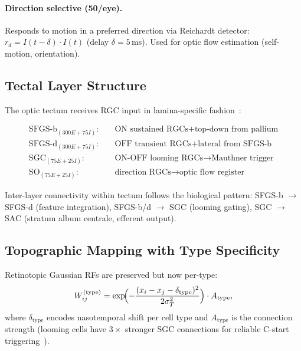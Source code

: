 \documentclass[11pt,a4paper]{article}
\begin{document}
\paragraph{Direction selective (50/eye).}
Responds to motion in a preferred direction via Reichardt detector:
$r_d = I(t-\delta) \cdot I(t)$ (delay $\delta = 5$\,ms).
Used for optic flow estimation (self-motion, orientation).

\subsection{Tectal Layer Structure}

The optic tectum receives RGC input in lamina-specific fashion~\cite{robles2014}:

\begin{equation}\label{eq:tectal_layers}
\begin{aligned}
  \text{SFGS-b}_{(300E+75I)}: &\quad \text{ON sustained RGCs} + \text{top-down from pallium} \\
  \text{SFGS-d}_{(300E+75I)}: &\quad \text{OFF transient RGCs} + \text{lateral from SFGS-b} \\
  \text{SGC}_{(75E+25I)}:     &\quad \text{ON-OFF looming RGCs} \to \text{Mauthner trigger} \\
  \text{SO}_{(75E+25I)}:      &\quad \text{direction RGCs} \to \text{optic flow register}
\end{aligned}
\end{equation}

Inter-layer connectivity within tectum follows the biological pattern:
SFGS-b $\to$ SFGS-d (feature integration), SFGS-b/d $\to$ SGC (looming gating),
SGC $\to$ SAC (stratum album centrale, efferent output).

\subsection{Topographic Mapping with Type Specificity}

Retinotopic Gaussian RFs are preserved but now per-type:
\begin{equation}\label{eq:topo_v2}
  W_{ij}^{(\text{type})} = \exp\!\Bigl(-\frac{(x_i - x_j - \delta_\text{type})^2}{2\sigma_T^2}\Bigr)
  \cdot A_\text{type},
\end{equation}
where $\delta_\text{type}$ encodes nasotemporal shift per cell type and
$A_\text{type}$ is the connection strength (looming cells have $3\times$
stronger SGC connections for reliable C-start triggering~\cite{temizer2015}).
\end{document}
